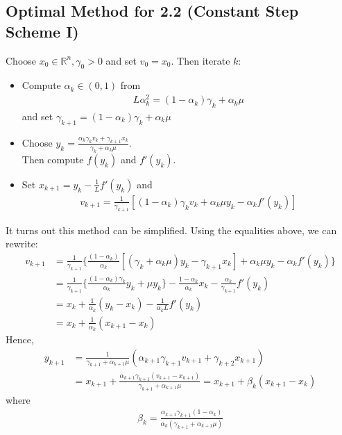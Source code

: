 \documentclass[12pt,a4paper]{article}
\begin{document}
	\subsection*{Optimal Method for 2.2 (Constant Step Scheme I)}\label{sec22optvar1}
	Choose $x_0 \in \mathbb{R}^n, \gamma_0 > 0$ and set $v_0 = x_0$.
	Then iterate $k$:
	\begin{itemize}
		\item Compute $\alpha_k \in (0,1)$ from
		\begin{align*}
			L\alpha_k^2 = (1 - \alpha_k)\gamma_k + \alpha_k\mu
		\end{align*}
		and set $\gamma_{k+1} = (1 - \alpha_k)\gamma_k + \alpha_k\mu$
		\item Choose $y_k = \frac{\alpha_k\gamma_kv_k + \gamma_{k+1}x_k}{\gamma_k + \alpha_k\mu}$. \\
		Then compute $f(y_k)$ and $f'(y_k)$.
		\item Set $x_{k+1} = y_k - \frac{1}{L}f'(y_k)$ and 
		\begin{align*}
			v_{k+1} = \frac{1}{\gamma_{k+1}} [(1 - \alpha_k)\gamma_kv_k + \alpha_k\mu y_k - \alpha_kf'(y_k)]
		\end{align*}
	\end{itemize}
	It turns out this method can be simplified. Using the equalities above, we can rewrite:
	\begin{align*}
		v_{k+1} &= \frac{1}{\gamma_{k+1}}\{\frac{(1 - \alpha_k)}{\alpha_k}[(\gamma_k + \alpha_k \mu)y_k - \gamma_{k+1}x_k] + \alpha_k\mu y_k - \alpha_kf'(y_k)\} \\
		&= \frac{1}{\gamma_{k+1}}\{\frac{(1 - \alpha_k)\gamma_k}{\alpha_k}y_k + \mu y_k\} - \frac{1 - \alpha_k}{\alpha_k}x_k - \frac{\alpha_k}{\gamma_{k+1}}f'(y_k) \\
		&= x_k + \frac{1}{\alpha_k}(y_k - x_k) - \frac{1}{\alpha_k L}f'(y_k) \\
		&= x_k + \frac{1}{\alpha_k}(x_{k+1} - x_k)
	\end{align*}
	Hence,
	\begin{align*}
		y_{k+1} &= \frac{1}{\gamma_{k+1} + \alpha_{k+1}\mu}(\alpha_{k+1}\gamma_{k+1}v_{k+1} + \gamma_{k+2}x_{k+1}) \\
		&= x_{k+1}+ \frac{\alpha_{k+1}\gamma_{k+1}(v_{k+1} - x_{k+1})}{\gamma_{k+1} + \alpha_{k+1}\mu} = x_{k+1} + \beta_k(x_{k+1} - x_k)
	\end{align*}
	where 
	\begin{align*}
		\beta_k = \frac{\alpha_{k+1}\gamma_{k+1}(1 - \alpha_k)}{\alpha_k(\gamma_{k+1} + \alpha_{k+1}\mu)}
	\end{align*}
\end{document}
